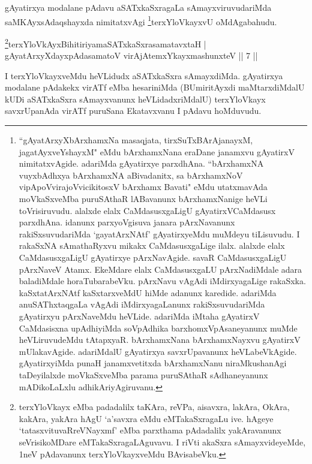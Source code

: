 \begin{artha} 
gAyatirxya modalane pAdavu aSATxkaSxragaLa sAmayxviruvudariMda 
saMKAyxsAdaqshayxda nimitatxvAgi \footnote{``gAyatArxyXbArxhamxNa masaqjata, tirxSuTxBArAjanayxM, jagatAyxveYshayxM" eMdu 
bArxhamxNana eraDane janamxvu gAyatirxV nimitatxvAgide. adariMda 
gAyatirxye parxdhAna. ``bArxhamxNA vuyxbAdhxya bArxhamxNA aBivadanitx, sa bArxhamxNoV vipApoVvirajoV\s vicikitosxV bArxhamx Bavati" eMdu utatxmavAda moVkaSxveMba 
puruSAthaR lABavanunx bArxhamxNanige heVLi toVrisiruvudu. alalxde 
elalx CaMdasusxgaLigU gAyatirxVCaMdasusx parxdhAna. idanunx 
parxyoVgisuva janara pArxNavanunx rakiSxsuvudariMda `gayatArxNAtf' 
gAyatirxyeMdu muMdeyu tiLisuvudu. I rakaSxNA sAmathaRyxvu mikakx 
CaMdasusxgaLige ilalx. alalxde elalx CaMdasusxgaLigU gAyatirxye 
pArxNavAgide. savaR CaMdasusxgaLigU pArxNaveV Atamx. EkeMdare elalx 
CaMdasusxgaLU pArxNadiMdale adara baladiMdale horaTubarabeVku. 
pArxNavu vAgAdi iMdirxyagaLige rakaSxka. kaSxtatArxNAtf kaSxtarxveMdU 
hiMde adanunx karedide. adariMda anuSAThxtaqgaLa vAgAdi 
iMdirxyagaLanunx rakiSxsuvudariMda gAyatirxyu pArxNaveMdu heVLide. 
adariMda iMtaha gAyatirxV CaMdasisxna upAdhiyiMda soVpAdhika 
barxhomxVpAsaneyanunx muMde heVLiruvudeMdu tAtapxyaR. bArxhamxNana 
bArxhamxNayxvu gAyatirxV mUlakavAgide. adariMdalU gAyatirxya 
savxrUpavanunx heVLabeVkAgide. gAyatirxyiMda punaH janamxvetitxda 
bArxhamxNanu niraMkushanAgi taDeyilalxde moVkaSxveMba parama 
puruSAthaR sAdhaneyanunx mADikoLaLxlu adhikAriyAgiruvanu.}terxYloVkayxvU 
oMdAgabahudu.
\end{artha}


\begin{shl}
\footnote{terxYloVkayx eMba padadalilx taKAra, reVPa, aisavxra, 
lakAra, OkAra, kakAra, yakAra hAgU `a'savxra eMdu eMTakaSxragaLu ive. hAgeye 
`tatasxvituvaRreVNayxmf' eMba parxthama pAdadalilx yakAravanunx 
seVrisikoMDare eMTakaSxragaLAguvavu. I riVti akaSxra sAmayxvideyeMde, 
1neV pAdavanunx terxYloVkayxveMdu BAvisabeVku.}terxYloVkAyxBihitiriyamaSATxkaSxrasamatavxtaH | \\
gAyatArxyXdayxpAdasamatoV virAjA\s \s temxYkayxmashunxteV \hfill ||  7 || 
\end{shl}

\begin{artha} 
I terxYloVkayxveMdu heVLidudx aSATxkaSxra sAmayxdiMda. gAyatirxya 
modalane pAdakekx virATf eMba hesariniMda (BUmiritAyxdi maMtarxdiMdalU 
kUDi aSATxkaSxra sAmayxvanunx heVLidadxriMdalU) terxYloVkayx 
savxrUpanAda virATf puruSana Ekatavxvanu I pAdavu hoMduvudu.
\end{artha}

